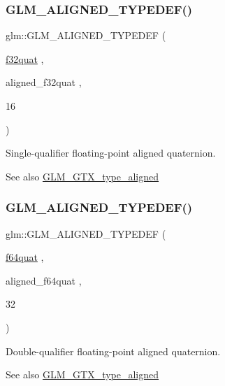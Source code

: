 \subsubsection{\texorpdfstring{G\+L\+M\+\_\+\+A\+L\+I\+G\+N\+E\+D\+\_\+\+T\+Y\+P\+E\+D\+E\+F()}{GLM\_ALIGNED\_TYPEDEF()}\hspace{0.1cm}{\footnotesize\ttfamily [208/209]}}
{\footnotesize\ttfamily glm\+::\+G\+L\+M\+\_\+\+A\+L\+I\+G\+N\+E\+D\+\_\+\+T\+Y\+P\+E\+D\+EF (\begin{DoxyParamCaption}\item[{\hyperlink{group__gtc__type__precision_gac59c4d798396552e4bbb866b3d8a2f18}{f32quat}}]{,  }\item[{aligned\+\_\+f32quat}]{,  }\item[{16}]{ }\end{DoxyParamCaption})}

Single-\/qualifier floating-\/point aligned quaternion. \begin{DoxySeeAlso}{See also}
\hyperlink{group__gtx__type__aligned}{G\+L\+M\+\_\+\+G\+T\+X\+\_\+type\+\_\+aligned} 
\end{DoxySeeAlso}
\mbox{\label{group__gtx__type__aligned_ga95cc03b8b475993fa50e05e38e203303}} 
\subsubsection{\texorpdfstring{G\+L\+M\+\_\+\+A\+L\+I\+G\+N\+E\+D\+\_\+\+T\+Y\+P\+E\+D\+E\+F()}{GLM\_ALIGNED\_TYPEDEF()}\hspace{0.1cm}{\footnotesize\ttfamily [209/209]}}
{\footnotesize\ttfamily glm\+::\+G\+L\+M\+\_\+\+A\+L\+I\+G\+N\+E\+D\+\_\+\+T\+Y\+P\+E\+D\+EF (\begin{DoxyParamCaption}\item[{\hyperlink{group__gtc__type__precision_ga5b54d7b36fbee5e271f73e6ed74e7172}{f64quat}}]{,  }\item[{aligned\+\_\+f64quat}]{,  }\item[{32}]{ }\end{DoxyParamCaption})}

Double-\/qualifier floating-\/point aligned quaternion. \begin{DoxySeeAlso}{See also}
\hyperlink{group__gtx__type__aligned}{G\+L\+M\+\_\+\+G\+T\+X\+\_\+type\+\_\+aligned} 
\end{DoxySeeAlso}

